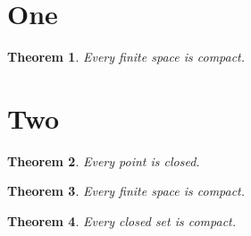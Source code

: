 \documentclass{article}
\newtheorem{theorem}{Theorem}[section]
\newenvironment{restate}[1]
    {\def\thetheorem{#1}\begin{theorem}}
    {\end{theorem}\addtocounter{theorem}{-1}}
\begin{document}
\section{One}
\begin{theorem}\label{thm:main} Every finite space is compact. \end{theorem}
\section{Two}
\begin{theorem} Every point is closed. \end{theorem}
\begin{restate}{\ref{thm:main}} Every finite space is compact. \end{restate}
\begin{theorem} Every closed set is compact. \end{theorem}
\end{document}
